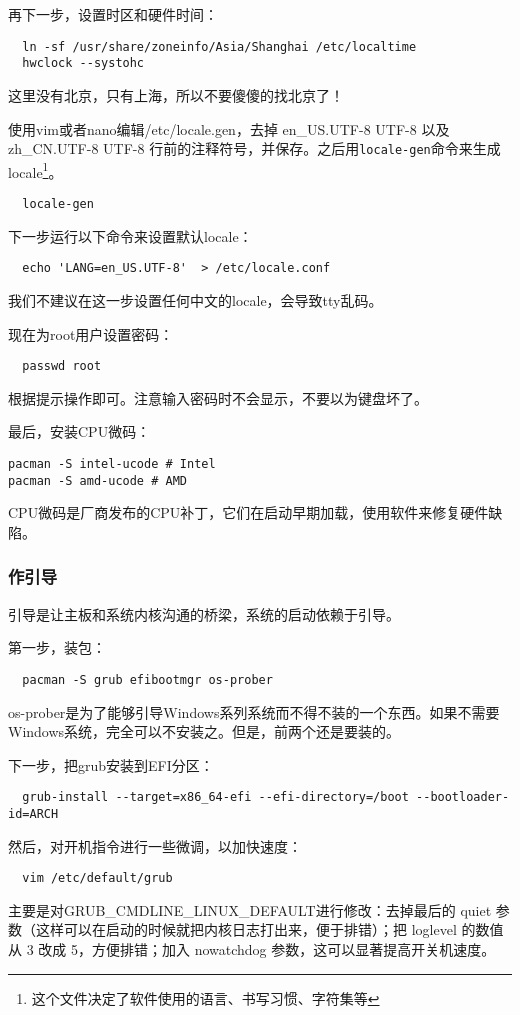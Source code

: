 \documentclass[../main.tex]{subfiles}
\begin{document}
再下一步，设置时区和硬件时间：
\begin{lstlisting}
  ln -sf /usr/share/zoneinfo/Asia/Shanghai /etc/localtime
  hwclock --systohc
\end{lstlisting}
这里没有北京，只有上海，所以不要傻傻的找北京了！

使用vim或者nano编辑/etc/locale.gen，去掉 en\_US.UTF-8 UTF-8 以及 zh\_CN.UTF-8 UTF-8 行前的注释符号，并保存。之后用\texttt{locale-gen}命令来生成locale\footnote{这个文件决定了软件使用的语言、书写习惯、字符集等}。

\begin{lstlisting}
  locale-gen
\end{lstlisting}

下一步运行以下命令来设置默认locale：
\begin{lstlisting}
  echo 'LANG=en_US.UTF-8'  > /etc/locale.conf
\end{lstlisting}
我们不建议在这一步设置任何中文的locale，会导致tty乱码。

现在为root用户设置密码：
\begin{lstlisting}
  passwd root
\end{lstlisting}
根据提示操作即可。注意输入密码时不会显示，不要以为键盘坏了。

最后，安装CPU微码：
\begin{lstlisting}
pacman -S intel-ucode # Intel
pacman -S amd-ucode # AMD
\end{lstlisting}
CPU微码是厂商发布的CPU补丁，它们在启动早期加载，使用软件来修复硬件缺陷。

\subsubsection{作引导}

引导是让主板和系统内核沟通的桥梁，系统的启动依赖于引导。

第一步，装包：
\begin{lstlisting}
  pacman -S grub efibootmgr os-prober
\end{lstlisting}
os-prober是为了能够引导Windows系列系统而不得不装的一个东西。如果不需要Windows系统，完全可以不安装之。但是，前两个还是要装的。

下一步，把grub安装到EFI分区：
\begin{lstlisting}
  grub-install --target=x86_64-efi --efi-directory=/boot --bootloader-id=ARCH
\end{lstlisting}

然后，对开机指令进行一些微调，以加快速度：
\begin{lstlisting}
  vim /etc/default/grub
\end{lstlisting}
主要是对GRUB\_CMDLINE\_LINUX\_DEFAULT进行修改：去掉最后的 quiet 参数（这样可以在启动的时候就把内核日志打出来，便于排错）；把 loglevel 的数值从 3 改成 5，方便排错；加入 nowatchdog 参数，这可以显著提高开关机速度。
\end{document}
